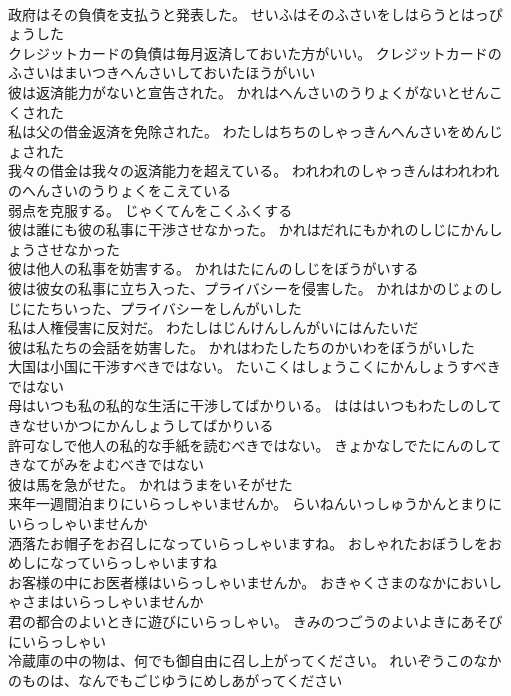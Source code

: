\documentclass[8pt]{extreport}
\begin{document}
\begin{CJK}{UTF8}{min}
\\	政府はその負債を支払うと発表した。	せいふはそのふさいをしはらうとはっぴょうした 
\\	クレジットカードの負債は毎月返済しておいた方がいい。	クレジットカードのふさいはまいつきへんさいしておいたほうがいい 
\\	彼は返済能力がないと宣告された。	かれはへんさいのうりょくがないとせんこくされた 
\\	私は父の借金返済を免除された。	わたしはちちのしゃっきんへんさいをめんじょされた 
\\	我々の借金は我々の返済能力を超えている。	われわれのしゃっきんはわれわれのへんさいのうりょくをこえている 
\\	弱点を克服する。	じゃくてんをこくふくする 
\\	彼は誰にも彼の私事に干渉させなかった。	かれはだれにもかれのしじにかんしょうさせなかった 
\\	彼は他人の私事を妨害する。	かれはたにんのしじをぼうがいする 
\\	彼は彼女の私事に立ち入った、プライバシーを侵害した。	かれはかのじょのしじにたちいった、プライバシーをしんがいした 
\\	私は人権侵害に反対だ。	わたしはじんけんしんがいにはんたいだ 
\\	彼は私たちの会話を妨害した。	かれはわたしたちのかいわをぼうがいした 
\\	大国は小国に干渉すべきではない。	たいこくはしょうこくにかんしょうすべきではない 
\\	母はいつも私の私的な生活に干渉してばかりいる。	はははいつもわたしのしてきなせいかつにかんしょうしてばかりいる 
\\	許可なしで他人の私的な手紙を読むべきではない。	きょかなしでたにんのしてきなてがみをよむべきではない 
\\	彼は馬を急がせた。	かれはうまをいそがせた 
\\	来年一週間泊まりにいらっしゃいませんか。	らいねんいっしゅうかんとまりにいらっしゃいませんか 
\\	洒落たお帽子をお召しになっていらっしゃいますね。	おしゃれたおぼうしをおめしになっていらっしゃいますね 
\\	お客様の中にお医者様はいらっしゃいませんか。	おきゃくさまのなかにおいしゃさまはいらっしゃいませんか 
\\	君の都合のよいときに遊びにいらっしゃい。	きみのつごうのよいよきにあそびにいらっしゃい 
\\	冷蔵庫の中の物は、何でも御自由に召し上がってください。	れいぞうこのなかのものは、なんでもごじゆうにめしあがってください 

\end{CJK}
\end{document}
